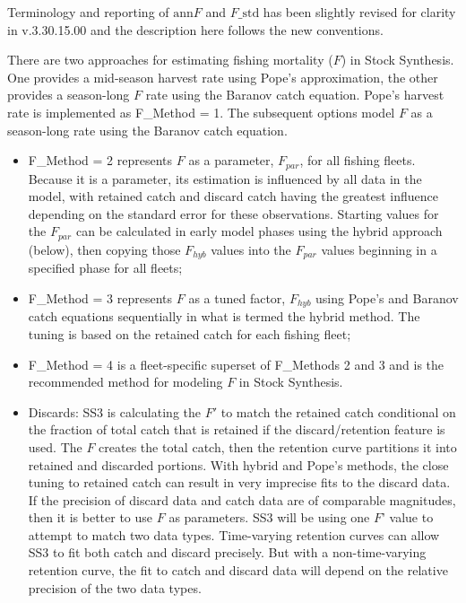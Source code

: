 Terminology and reporting of $\text{ann}F$ and $F\text{\_std}$ has been slightly revised for clarity in v.3.30.15.00 and the description here follows the new conventions.

There are two approaches for estimating fishing mortality ($F$) in Stock Synthesis. One provides a mid-season harvest rate using Pope’s approximation, the other provides a season-long $F$ rate using the Baranov catch equation. Pope’s harvest rate is implemented as F\_Method = 1. The subsequent options model $F$ as a season-long rate using the Baranov catch equation.

\begin{itemize}
	\item F\_Method = 2 represents $F$ as a parameter, $F_{par}$, for all fishing fleets. Because it is a parameter, its estimation is influenced by all data in the model, with retained catch and discard catch having the greatest influence depending on the standard error for these observations. Starting values for the $F_{par}$ can be calculated in early model phases using the hybrid approach (below), then copying those $F_{hyb}$ values into the $F_{par}$ values beginning in a specified phase for all fleets;
	\item F\_Method = 3 represents $F$ as a tuned factor, $F_{hyb}$ using Pope's and Baranov catch equations sequentially in what is termed the hybrid method. The tuning is based on the retained catch for each fishing fleet;
	\item F\_Method = 4 is a fleet-specific superset of F\_Methods 2 and 3 and is the recommended method for modeling $F$ in Stock Synthesis.
	\item Discards: SS3 is calculating the $F'$ to match the retained catch conditional on the fraction of total catch that is retained if the discard/retention feature is used. The $F$ creates the total catch, then the retention curve partitions it into retained and discarded portions. With hybrid and Pope’s methods, the close tuning to retained catch can result in very imprecise fits to the discard data. If the precision of discard data and catch data are of comparable magnitudes, then it is better to use $F$ as parameters. SS3 will be using one $F’$ value to attempt to match two data types. Time-varying retention curves can allow SS3 to fit both catch and discard precisely. But with a non-time-varying retention curve, the fit to catch and discard data will depend on the relative precision of the two data types.
\end{itemize}

